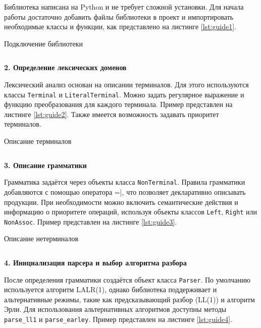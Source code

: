 \documentclass[14pt, russian]{scrartcl}
\begin{document}
Библиотека написана на Python и не требует сложной установки. Для начала работы достаточно добавить файлы
библиотеки в проект и импортировать необходимые классы и функции, как представлено на листинге \ref{lst:guide1}.

\begin{listing}[H]
	\caption{Подключение библиотеки}
	\label{lst:guide1}
	\inputminted[style=bw, frame=single,fontsize = \footnotesize, linenos=false, xleftmargin = 1.5em]{python}{./listings/guide/1.py}
\end{listing}

\textbf{2. Определение лексических доменов}

Лексический анализ основан на описании терминалов. Для этого используются классы \texttt{Terminal} и
\texttt{LiteralTerminal}. Можно задать регулярное выражение и функцию преобразования для каждого терминала.
Пример представлен на листинге \ref{lst:guide2}. Также имеется возможность задавать приоритет терминалов.

\begin{listing}[H]
	\caption{Описание терминалов}
	\label{lst:guide2}
	\inputminted[style=bw, frame=single,fontsize = \footnotesize, linenos=false, xleftmargin = 1.5em]{python}{./listings/guide/2.py}
\end{listing}

\textbf{3. Описание грамматики}

Грамматика задаётся через объекты класса \texttt{NonTerminal}. Правила грамматики добавляются с помощью
оператора \verb||=|, что позволяет декларативно описывать продукции. При необходимости можно включить
семантические действия и информацию о приоритете операций, используя объекты классов
\texttt{Left}, \texttt{Right} или \texttt{NonAssoc}. Пример представлен на листинге \ref{lst:guide3}.

\begin{listing}[H]
	\caption{Описание нетерминалов}
	\label{lst:guide3}
	\inputminted[style=bw, frame=single,fontsize = \footnotesize, linenos=false, xleftmargin = 1.5em]{python}{./listings/guide/3.py}
\end{listing}

\textbf{4. Инициализация парсера и выбор алгоритма разбора}

После определения грамматики создаётся объект класса \texttt{Parser}. По умолчанию используется алгоритм LALR(1),
однако библиотека поддерживает и альтернативные режимы, такие как предсказывающий разбор (LL(1)) и
алгоритм Эрли. Для использования альтернативных алгоритмов доступны методы \texttt{parse\_ll1} и
\texttt{parse\_earley}. Пример представлен на листинге \ref{lst:guide4}.
\end{document}
